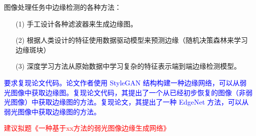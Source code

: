\documentclass[a4paper]{ctexart}
\begin{document}
	图像处理任务中边缘检测的各种方法：
	
	\begin{itemize}
		\item[(1)] 
		手工设计各种滤波器来生成边缘图。
		
		\item[(2)]
		根据人类设计的特征使用数据驱动模型来预测边缘（随机决策森林来学习边缘斑块）
		
		\item[(3)]
		深度学习方法从原始数据中学习复杂的特征表示端到端边缘检测模型。
	\end{itemize}	
	
	\textcolor{blue}{要求复现论文\cite{xu2023low}代码。论文作者使用 StyleGAN 结构构建一种边缘网络，可以从弱光图像中获取边缘图。复现论文\cite{zhu2020eemefn}代码，其提出了一个从已经初步恢复的图像（非弱光图像）中获取边缘图的方法。复现论文\cite{rana2021edge}，其提出了一种 EdgeNet 方法，可以从弱光图像中获取边缘图的方法。}
	
	\textcolor{red}{建议拟题《一种基于xx方法的弱光图像边缘生成网络》}
	
	\renewcommand{\refname}{References}
	
	
		
		
		
		
		
		
	
	
	
	
	
\end{document}
